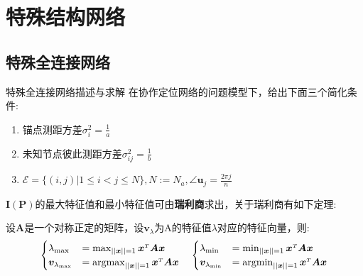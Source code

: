 \chapter{特殊结构网络}\label{cha:content4}
\section{特殊全连接网络}\label{section:complete_graph_cooperation}
{特殊全连接网络描述与求解}
在协作定位网络的问题模型下，给出下面三个简化条件:
\begin{enumerate}
\item 锚点测距方差$\sigma_i^2=\frac{1}{a}$
\item 未知节点彼此测距方差$\sigma^2_{ij}=\frac{1}{b}$
\item $\mathcal{E}=\{(i,j)|1\leq i <j\leq N\},N:=N_a,\angle\bm{u}_j=\frac{2\pi j}{n}$
\end{enumerate}
$\bm{I}(\bm{P})$的最大特征值和最小特征值可由\textbf{瑞利商}求出，关于瑞利商有如下定理:
\begin{theorem}\label{theorem:rayleigh}
  设$\bm{A}$是一个对称正定的矩阵，设$\bm{v}_{\lambda}$为A的特征值$\lambda$对应的特征向量，则:
\begin{align*}
\begin{cases}
\lambda_{\text{max}}&=\max_{||\bm{x}||=1} \bm{x}^{\scriptscriptstyle T}\bm{A}\bm{x}\\
\bm{v}_{\lambda_{\text{max}}}&=\operatorname*{argmax}_{||\bm{x}||=1} \bm{x}^{\scriptscriptstyle T}\bm{A}\bm{x}
\end{cases}\quad
\begin{cases}
\lambda_{\text{min}}&=\min_{||\bm{x}||=1} \bm{x}^{\scriptscriptstyle T}\bm{A}\bm{x}\\
\bm{v}_{\lambda_{\text{min}}}&=\operatorname*{argmin}_{||\bm{x}||=1} \bm{x}^{\scriptscriptstyle T}\bm{A}\bm{x}
\end{cases}
\end{align*}
\end{theorem}


